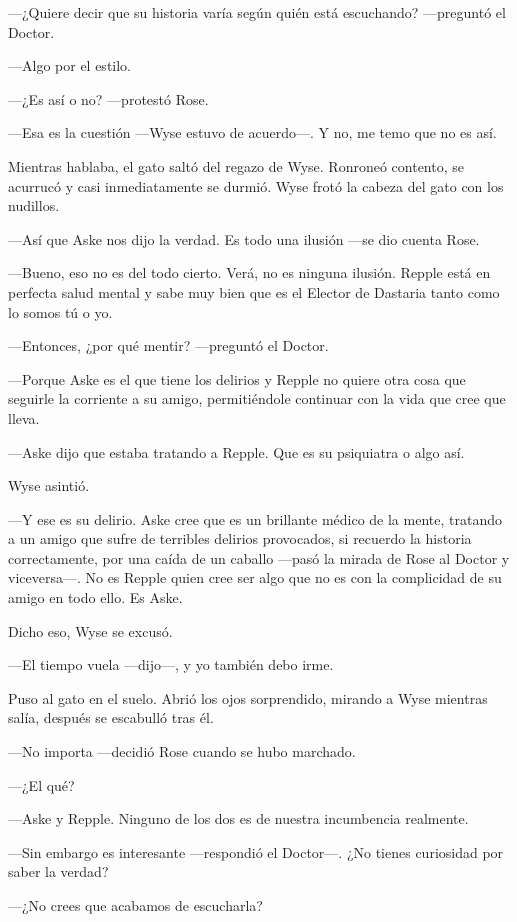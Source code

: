 {---¿Quiere decir que su historia varía según quién está escuchando?
---preguntó el Doctor.}

{---Algo por el estilo.}

{---¿Es así o no? ---protestó Rose.}

{---Esa es la cuestión ---Wyse estuvo de acuerdo---. Y no, me temo que
no es así.}

{Mientras hablaba, el gato saltó del regazo de Wyse. Ronroneó contento,
	se acurrucó y casi inmediatamente se durmió. Wyse frotó la cabeza del
gato con los nudillos.}

{---Así que Aske nos dijo la verdad. Es todo una ilusión ---se dio
cuenta Rose.}

{---Bueno, eso no es del todo cierto. Verá, no es ninguna ilusión.
	Repple está en perfecta salud mental y sabe muy bien que es el Elector
de Dastaria tanto como lo somos tú o yo.}

{---Entonces, ¿por qué mentir? ---preguntó el Doctor.}

{---Porque Aske es el que tiene los delirios y Repple no quiere otra
	cosa que seguirle la corriente a su amigo, permitiéndole continuar con
la vida que cree que lleva.}

{---Aske dijo que estaba tratando a Repple. Que es su psiquiatra o algo
así.}

{Wyse asintió.}

{---Y ese es su delirio. Aske cree que es un brillante médico de la
	mente, tratando a un amigo que sufre de terribles delirios provocados,
	si recuerdo la historia correctamente, por una caída de un caballo
	---pasó la mirada de Rose al Doctor y viceversa---. No es Repple quien
	cree ser algo que no es con la complicidad de su amigo en todo ello. Es
Aske.}

{Dicho eso, Wyse se excusó.}

{---El tiempo vuela ---dijo---, y yo también debo irme.}

{Puso al gato en el suelo. Abrió los ojos sorprendido, mirando a Wyse
mientras salía, después se escabulló tras él.}

{---No importa ---decidió Rose cuando se hubo marchado.}

{---¿El qué?}

{---Aske y Repple. Ninguno de los dos es de nuestra incumbencia
realmente.}

{---Sin embargo es interesante ---respondió el Doctor---. ¿No tienes
curiosidad por saber la verdad?}

{---¿No crees que acabamos de escucharla?}

